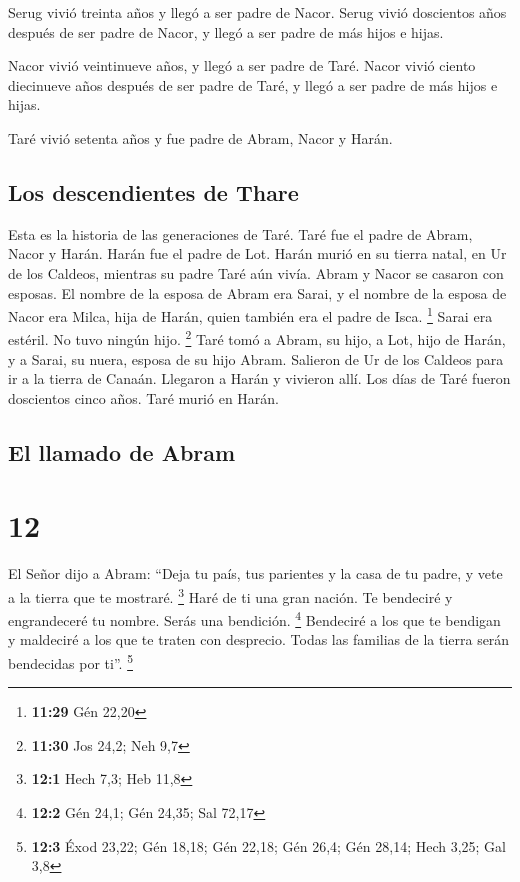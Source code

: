  Serug vivió treinta años y llegó a ser padre de Nacor.
 Serug vivió doscientos años después de ser padre de
Nacor, y llegó a ser padre de más hijos e hijas.

 Nacor vivió veintinueve años, y llegó a ser padre de
Taré.  Nacor vivió ciento diecinueve años después de ser
padre de Taré, y llegó a ser padre de más hijos e hijas.

 Taré vivió setenta años y fue padre de Abram, Nacor y
Harán.

\hypertarget{los-descendientes-de-thare}{%
\subsection{Los descendientes de
Thare}\label{los-descendientes-de-thare}}

 Esta es la historia de las generaciones de Taré. Taré
fue el padre de Abram, Nacor y Harán. Harán fue el padre de Lot.
 Harán murió en su tierra natal, en Ur de los Caldeos,
mientras su padre Taré aún vivía.  Abram y Nacor se
casaron con esposas. El nombre de la esposa de Abram era Sarai, y el
nombre de la esposa de Nacor era Milca, hija de Harán, quien también era
el padre de Isca. \footnote{\textbf{11:29} Gén 22,20} 
Sarai era estéril. No tuvo ningún hijo. \footnote{\textbf{11:30} Jos
  24,2; Neh 9,7}  Taré tomó a Abram, su hijo, a Lot, hijo
de Harán, y a Sarai, su nuera, esposa de su hijo Abram. Salieron de Ur
de los Caldeos para ir a la tierra de Canaán. Llegaron a Harán y
vivieron allí.  Los días de Taré fueron doscientos cinco
años. Taré murió en Harán.

\hypertarget{el-llamado-de-abram}{%
\subsection{El llamado de Abram}\label{el-llamado-de-abram}}

\hypertarget{section-11}{%
\section{12}\label{section-11}}

 El Señor dijo a Abram: ``Deja tu país, tus parientes y la
casa de tu padre, y vete a la tierra que te mostraré. \footnote{\textbf{12:1}
  Hech 7,3; Heb 11,8}  Haré de ti una gran nación. Te
bendeciré y engrandeceré tu nombre. Serás una bendición. \footnote{\textbf{12:2}
  Gén 24,1; Gén 24,35; Sal 72,17}  Bendeciré a los que te
bendigan y maldeciré a los que te traten con desprecio. Todas las
familias de la tierra serán bendecidas por ti''. \footnote{\textbf{12:3}
  Éxod 23,22; Gén 18,18; Gén 22,18; Gén 26,4; Gén 28,14; Hech 3,25; Gal
  3,8}

